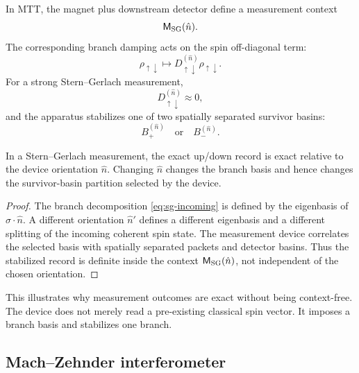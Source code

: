 \documentclass[11pt]{article}
\newcommand{\Meas}{\mathsf M}
\begin{document}
In MTT, the magnet plus downstream detector define a measurement context
\begin{equation}
  \Meas_{\rm SG}(\hat n).
\end{equation}
The corresponding branch damping acts on the spin off-diagonal term:
\begin{equation}
  \rho_{\uparrow\downarrow}
  \longmapsto
  D_{\uparrow\downarrow}^{(\hat n)}\rho_{\uparrow\downarrow}.
  \label{eq:sg-damping}
\end{equation}
For a strong Stern--Gerlach measurement,
\begin{equation}
  D_{\uparrow\downarrow}^{(\hat n)}\approx0,
\end{equation}
and the apparatus stabilizes one of two spatially separated survivor basins:
\begin{equation}
  B_+^{(\hat n)}
  \quad\text{or}\quad
  B_-^{(\hat n)}.
\end{equation}

\begin{proposition}
\label{prop:sg-context-basins}
In a Stern--Gerlach measurement, the exact up/down record is exact relative to the device
orientation \(\hat n\). Changing \(\hat n\) changes the branch basis and hence changes the
survivor-basin partition selected by the device.
\end{proposition}

\begin{proof}
The branch decomposition \eqref{eq:sg-incoming} is defined by the eigenbasis of
\(\sigma\cdot\hat n\). A different orientation \(\hat n'\) defines a different eigenbasis and a
different splitting of the incoming coherent spin state. The measurement device correlates
the selected basis with spatially separated packets and detector basins. Thus the stabilized
record is definite inside the context \(\Meas_{\rm SG}(\hat n)\), not independent of the
chosen orientation.
\end{proof}

This illustrates why measurement outcomes are exact without being context-free. The device
does not merely read a pre-existing classical spin vector. It imposes a branch basis and
stabilizes one branch.

\subsection{Mach--Zehnder interferometer}
\label{subsec:mach-zehnder}
\end{document}
